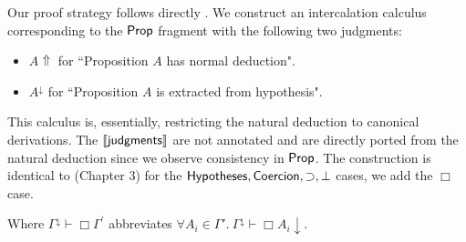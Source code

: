 Our proof strategy follows directly \cite{pfenning2004automated}. We construct an intercalation calculus \cite{sieg1998normal} corresponding to the ${\sf Prop}$ fragment  with the following two judgments:
\begin{itemize}
	\item[] $A\Uparrow$ for ``Proposition $A$ has normal deduction".
	\item[] $A^\downarrow$ for ``Proposition $A$ is extracted from hypothesis".
\end{itemize}
This calculus is, essentially, restricting the natural deduction to canonical derivations. The $\llbracket {\sf judgments} \rrbracket$ are not annotated and are directly ported from the natural deduction since we observe consistency in ${\sf Prop}$. 
The construction is identical to \cite{pfenning2004automated} (Chapter 3) for the ${\sf Hypotheses},{\sf Coercion},\supset, \bot$ cases, we add the $\Box$ case.
Where $\Gamma^\downarrow\vdash\Box \Gamma^{\prime}$ abbreviates $\forall A_i\in \Gamma'. \ \Gamma^{\downarrow}\vdash\Box A_i\downarrow$.

